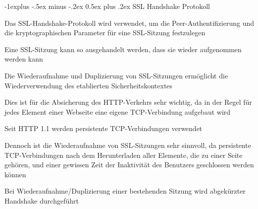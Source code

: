 \documentclass[a4paper]{article}
\makeatletter
\renewcommand{\subsection}{\@startsection{subsection}{2}{0mm}%
 {-1explus -.5ex minus -.2ex}%
 {0.5ex plus .2ex}%
 {\normalfont\normalsize\bfseries}}
\makeatother
\begin{document}
\begin{multicols}{3}
      \subsection{SSL Handshake Protokoll}
      \begin{itemize*}
            \item Das SSL-Handshake-Protokoll wird verwendet, um die Peer-Authentifizierung und die kryptographischen Parameter für eine SSL-Sitzung festzulegen
            \item Eine SSL-Sitzung kann so ausgehandelt werden, dass sie wieder aufgenommen werden kann
            \item Die Wiederaufnahme und Duplizierung von SSL-Sitzungen ermöglicht die Wiederverwendung des etablierten Sicherheitskontextes
            \item Dies ist für die Absicherung des HTTP-Verkehrs sehr wichtig, da in der Regel für jedes Element einer Webseite eine eigene TCP-Verbindung aufgebaut wird
            \item Seit HTTP 1.1 werden persistente TCP-Verbindungen verwendet
            \item Dennoch ist die Wiederaufnahme von SSL-Sitzungen sehr sinnvoll, da persistente TCP-Verbindungen nach dem Herunterladen aller Elemente, die zu einer Seite gehören, und einer gewissen Zeit der Inaktivität des Benutzers geschlossen werden können
            \item Bei Wiederaufnahme/Duplizierung einer bestehenden Sitzung wird abgekürzter Handshake durchgeführt
      \end{itemize*}


\end{multicols}
\end{document}
